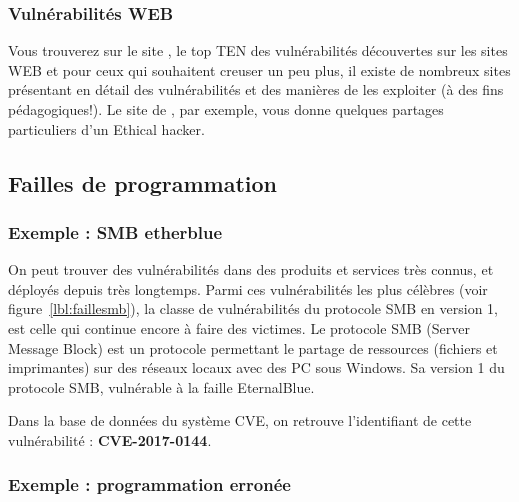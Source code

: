 

\subsubsection{Vulnérabilités WEB}

Vous trouverez sur le site , le top TEN des vulnérabilités découvertes sur les sites WEB
et pour ceux qui souhaitent creuser un peu plus, il existe de nombreux sites présentant en détail des vulnérabilités et des manières de les exploiter (à des fins pédagogiques!). Le site de , par exemple, vous donne quelques partages particuliers d'un Ethical hacker.

\subsection{Failles de programmation}

\subsubsection{Exemple : SMB etherblue}
On peut trouver des vulnérabilités dans des produits et services très connus, et déployés depuis très longtemps. 
Parmi ces vulnérabilités les plus célèbres (voir figure~\ref{lbl:faillesmb}), la classe de vulnérabilités du protocole SMB en version 1, est celle qui continue encore à faire des victimes.
Le protocole SMB (Server Message Block) est un protocole permettant le partage de ressources (fichiers et imprimantes) sur des réseaux locaux avec des PC sous Windows. Sa version 1 du protocole SMB, vulnérable à la faille EternalBlue.

Dans la base de données du système CVE, on retrouve l’identifiant de cette vulnérabilité : \textbf{CVE-2017-0144}. 

\subsubsection{Exemple : programmation erronée}

